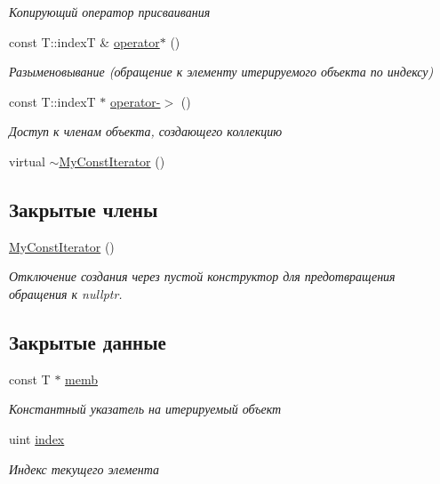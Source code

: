 \begin{DoxyCompactItemize}
\begin{DoxyCompactList}\small\item\em Копирующий оператор присваивания \end{DoxyCompactList}\item 
const T\+::index\+T \& \hyperlink{class_network_service_1_1_my_const_iterator_a7e881c108297cb10d072347e9ff86300}{operator$\ast$} ()
\begin{DoxyCompactList}\small\item\em Разыменовывание (обращение к элементу итерируемого объекта по индексу) \end{DoxyCompactList}\item 
const T\+::index\+T $\ast$ \hyperlink{class_network_service_1_1_my_const_iterator_a77f6dccb9a4a298307b8ba81dcaafeb6}{operator-\/$>$} ()
\begin{DoxyCompactList}\small\item\em Доступ к членам объекта, создающего коллекцию \end{DoxyCompactList}\item 
virtual \hyperlink{class_network_service_1_1_my_const_iterator_a3d169b0e5975d614272a0c8a3573cc25}{$\sim$\+My\+Const\+Iterator} ()
\end{DoxyCompactItemize}
\subsection*{Закрытые члены}
\begin{DoxyCompactItemize}
\item 
\hyperlink{class_network_service_1_1_my_const_iterator_ab1acfcd83f296465c285a336e8fb6e69}{My\+Const\+Iterator} ()
\begin{DoxyCompactList}\small\item\em Отключение создания через пустой конструктор для предотвращения обращения к nullptr. \end{DoxyCompactList}\end{DoxyCompactItemize}
\subsection*{Закрытые данные}
\begin{DoxyCompactItemize}
\item 
const T $\ast$ \hyperlink{class_network_service_1_1_my_const_iterator_ac9879e15103086204afa1af2aa6341a5}{memb}
\begin{DoxyCompactList}\small\item\em Константный указатель на итерируемый объект \end{DoxyCompactList}\item 
uint \hyperlink{class_network_service_1_1_my_const_iterator_a9350ef04e3633db10f91f6662d1df1a4}{index}
\begin{DoxyCompactList}\small\item\em Индекс текущего элемента \end{DoxyCompactList}\end{DoxyCompactItemize}
